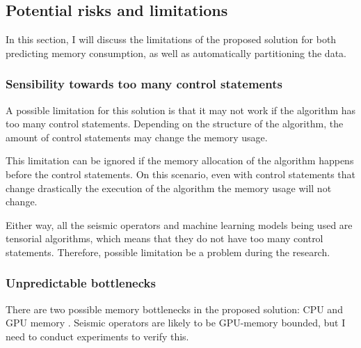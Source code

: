 \subsection{Potential risks and limitations}
\label{subsec:potential-risks-and-limitations}

In this section, I will discuss the limitations of the proposed solution for both predicting memory consumption, as well as automatically partitioning the data.

\subsubsection{Sensibility towards too many control statements}

A possible limitation for this solution is that it may not work if the algorithm has too many control statements.
Depending on the structure of the algorithm, the amount of control statements may change the memory usage.

This limitation can be ignored if the memory allocation of the algorithm happens before the control statements. 
On this scenario, even with control statements that change drastically the execution of the algorithm the memory usage will not change. 

Either way, all the seismic operators and machine learning models being used are tensorial algorithms, which means that they do not have too many control statements. 
Therefore,  possible limitation  be a problem during the research.

\subsubsection{Unpredictable bottlenecks}

There are two possible memory bottlenecks in the proposed solution: \ac{CPU} and \ac{GPU} memory .
Seismic operators are likely to be \ac{GPU}-memory bounded, but I need to conduct experiments to verify this.

